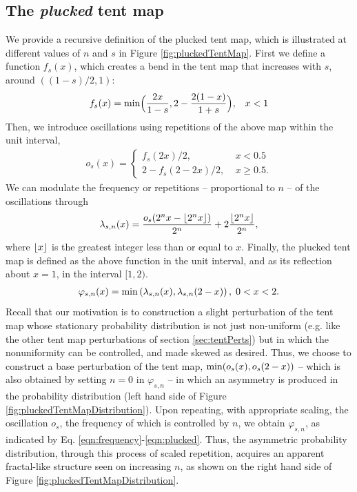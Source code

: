 \subsection{The \emph{plucked} tent map}
\label{sec:pluckedTentMap}
We provide a recursive definition of the plucked tent map, which 
is illustrated at different values of $n$ and $s$ in Figure \ref{fig:pluckedTentMap}. First we define a function $f_s(x)$, which 
creates a bend in the tent map that increases with $s$, around 
$((1-s)/2,1)$:
\begin{align}
		f_s(x) = 		{\rm min}\Big(
				\dfrac{2x}{1-s}, 2 - \dfrac{2(1-x)}{1+s}\Big),
				\;\;\; x < 1 \\
\end{align}
Then, we introduce oscillations using repetitions of
the above map within the unit interval,
\begin{align}
		o_s(x) = \begin{cases}
				f_s(2x)/2, & \; x < 0.5 \\
				2 - f_s(2-2x)/2, & \; x \ge 0.5.
		\end{cases}
\end{align}
We can modulate
the frequency or repetitions -- proportional to $n$ -- 
of the oscillations through
\begin{align}
		\label{eqn:frequency}
		\lambda_{s,n}(x) = \dfrac{o_s(2^n x - \floor*{2^n x})}{2^n} 
		+ 2 \frac{\floor*{2^n x}}{2^n},
\end{align}
where $\floor*{x}$ is the greatest integer less than or equal to $x$.
Finally, the plucked tent map is defined as the above function 
in the unit interval, and as its reflection about $x=1$,
in the interval $[1,2)$.
\begin{align}
		\label{eqn:plucked}
		\varphi_{s,n}(x) = {\rm min}\left(
		\lambda_{s,n}(x), \lambda_{s,n}(2-x)\right), \; 0< x < 2. 
\end{align}
Recall that our motivation is to construction a slight perturbation of the tent map whose stationary probability distribution is not just 
non-uniform (e.g. like the other tent map perturbations of section \ref{sec:tentPerts}) but in which the nonuniformity can be controlled, and made skewed as desired. Thus, we choose to construct a base perturbation of the tent map, ${\rm min}(o_s(x), o_s(2-x))$ -- 
which is also obtained by setting $n=0$ in $\varphi_{s,n}$ --  
in which an asymmetry is produced in the probability distribution (left hand side of Figure \ref{fig:pluckedTentMapDistribution}).
Upon repeating, with appropriate scaling, the oscillation $o_s$, 
the frequency of which is controlled by $n$, we obtain $\varphi_{s,n}$, 
as indicated by Eq. \ref{eqn:frequency}-\ref{eqn:plucked}. Thus, the asymmetric probability distribution, through this process of scaled repetition, acquires an apparent fractal-like structure seen on increasing $n$, as shown on the right hand side of Figure \ref{fig:pluckedTentMapDistribution}.


